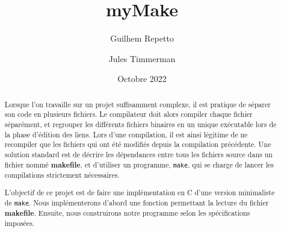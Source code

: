\documentclass[11pt]{article}
\title{myMake}
\date{Octobre 2022}
\author{Guilhem Repetto \and Jules Timmerman}
\begin{document}
\maketitle

\begin{abstract}
Lorsque l'on travaille sur un projet suffisamment complexe, il est pratique de séparer son code en plusieurs fichiers. Le compilateur doit alors compiler chaque fichier séparément, et regrouper les différents fichiers binaires en un unique exécutable lors de la phase d'édition des liens. Lors d'une compilation, il est ainsi légitime de ne recompiler que les fichiers qui ont été modifiés depuis la compilation précédente. Une solution standard est de décrire les dépendances entre tous les fichiers source dans un fichier nommé \textbf{makefile}, et d'utiliser un programme, \texttt{make}, qui se charge de lancer les compilations strictement nécessaires.

L'objectif de ce projet est de faire une implémentation en C d'une version minimaliste de \texttt{make}. Nous implémenterons d'abord une fonction permettant la lecture du fichier \textbf{makefile}. Ensuite, nous construirons notre programme selon les spécifications imposées.

\end{abstract}
\end{document}
